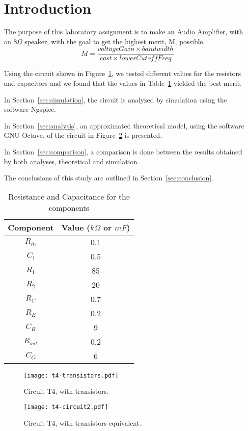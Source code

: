 \section{Introduction}
\label{sec:introduction}

The purpose of this laboratory assignment is to make an Audio Amplifier, with an $8\Omega$ speaker, with the goal to get the highest merit, M, possible.
$$ M = \frac{voltageGain \times bandwidth}{cost \times lowerCutoffFreq}$$

Using the circuit shown in Figure~\ref{fig:t4-transistors}, we tested different values for the resistors and capacitors and we found that the values in Table~\ref{tab:values} yielded the best merit.

In Section~\ref{sec:simulation}, the circuit is analyzed by simulation using the software Ngspice. 

In Section~\ref{sec:analysis}, an approximated theoretical model, using the software GNU Octave, of the circuit in Figure~\ref{fig:t4-equiv} is presented. 

In Section~\ref{sec:comparison}, a comparison is done between the results obtained by both analyses, theoretical and simulation.

The conclusions of this study are outlined in Section~\ref{sec:conclusion}.

\begin{table}[ht!]
    \centering
    \begin{tabular}{c c}
    \toprule
    Component & Value ($k\Omega$ or $mF$) \\ \midrule
    $R_{in}$  & 0.1 \\
    $C_i$     & 0.5 \\
    $R_1$     & 85  \\
    $R_2$     & 20  \\
    $R_C$     & 0.7   \\
    $R_E$     & 0.2 \\
    $C_B$     & 9   \\
    $R_{out}$ & 0.2 \\
    $C_O$     & 6   \\
    \end{tabular}
    \caption{Resistance and Capacitance for the components}
    \label{tab:values}
\end{table}


\begin{figure}[ht!]
\centering
    \texttt{[image: t4-transistors.pdf]}
\caption{Circuit T4, with transistors.}
\label{fig:t4-transistors}
\end{figure}

\begin{figure}[ht!]
\centering
    \texttt{[image: t4-circuit2.pdf]}
\caption{Circuit T4, with transistors equivalent.}
\label{fig:t4-equiv}
\end{figure}

\FloatBarrier
\clearpage
